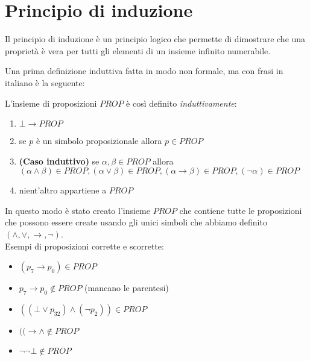 \documentclass{article}
\theoremstyle{break}
\theoremstyle{break}
\theoremstyle{break}
\theoremstyle{break}
\begin{document}
\section{Principio di induzione}
Il principio di induzione è un principio logico che permette di dimostrare che una proprietà è vera
per tutti gli elementi di un insieme infinito numerabile.

Una prima definizione induttiva fatta in modo non formale, ma con frasi in italiano è la seguente:

L'insieme di proposizioni \( PROP \) è così definito \emph{induttivamente}:
\begin{enumerate}
	\item \( \bot \to PROP \)
	\item se \( p \) è un simbolo proposizionale allora \( p \in PROP \)
	\item \textbf{(Caso induttivo)} se \( \alpha, \beta \in PROP \) allora
	      \( (\alpha \wedge \beta ) \in PROP, (\alpha \vee \beta ) \in PROP,
	      (\alpha \to \beta ) \in PROP, (\neg \alpha ) \in PROP \)
	\item nient'altro appartiene a \( PROP \)
\end{enumerate}

In questo modo è stato creato l'insieme \( PROP \) che contiene tutte le proposizioni che possono essere create
usando gli unici simboli che abbiamo definito \( (\wedge, \vee, \to, \neg) \).
\vspace{0.5cm}
\\
Esempi di proposizioni corrette e scorrette:
\begin{itemize}
	\item \( (p_{7} \to p_{0}) \in PROP \)
	\item \( p_{7} \to p_{0} \notin PROP \) (mancano le parentesi)
	\item \( ((\bot \vee p_{32}) \wedge (\neg p_{2})) \in PROP \)
	\item \( ((\to \wedge \notin PROP \)
	\item \( \neg \neg \bot \notin PROP \)
\end{itemize}
\end{document}
